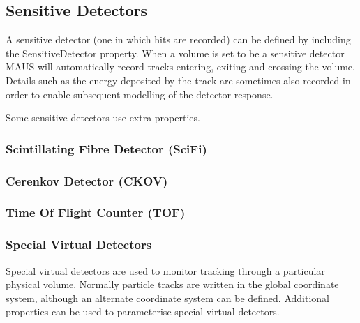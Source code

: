 \subsection{Sensitive Detectors}
A sensitive detector (one in which hits are recorded) can be defined by including the SensitiveDetector property. When a
volume is set to be a sensitive detector MAUS will automatically record tracks entering, exiting and crossing the
volume. Details such as the energy deposited by the track are sometimes also recorded in order to enable subsequent
modelling of the detector response.

Some sensitive detectors use extra properties.

\subsubsection[Scintillating Fibre Detector (SciFi)]{Scintillating Fibre Detector (SciFi)}
\subsubsection{Cerenkov Detector (CKOV)}
\subsubsection{Time Of Flight Counter (TOF)}
\subsubsection{Special Virtual Detectors}
Special virtual detectors are used to monitor tracking through a particular physical volume. Normally particle tracks
are written in the global coordinate system, although an alternate coordinate system can be defined. Additional
properties can be used to parameterise special virtual detectors.

